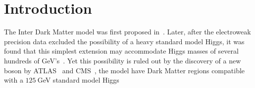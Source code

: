 \documentclass{article}
\begin{document}
\section{Introduction}
The Inter Dark Matter model was first proposed
in~\cite{Deshpande:1977rw}. Later, after the electroweak precision
data excluded the possibility of a heavy standard model Higgs, it was
found that this simplest extension may accommodate Higgs masses of
several hundreds of GeV's~\cite{hep-ph/0603188}. Yet this possibility
is ruled out by the discovery of a new boson by ATLAS~\cite{1207.7214}
and CMS~\cite{1207.7235}, the model have Dark Matter regions compatible
with a $125\ $GeV standard model
Higgs~\cite{hep-ph/0612275,0903.4010,0911.0540}


 

\end{document}
